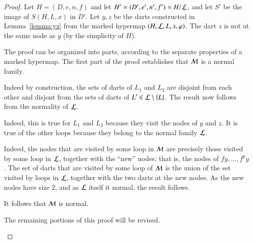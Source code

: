 \begin{proof} Let $H=(D,e,n,f)$ and let $H' =(D',e',n',f') = H/{\cal
    L}$, and let $S'$ be the image of $S(H,L,x)$ in $D'$.  Let $y,z$
  be the darts constructed in Lemma~\ref{lemma:yz} from the marked
  hypermap $(H,{\cal L},L,x,\varphi)$.  The dart
$z$ is not at the same node as $y$ (by the simplicity of $H$).

  The proof can be organized into parts, according to the separate
  properties of a marked hypermap.  The first part of the proof
  establishes that ${\cal M}$ is a normal family.




 
Indeed by construction, the sets of darts of $L_1$ and $L_2$
are disjoint from each other and disjont from the sets of darts of $L'\in
{\cal L}\setminus \{L\}$.  The result now follows from the normality of  ${\cal L}$.

   Indeed, this
is true for $L_1$ and $L_2$ because they visit the nodes of $y$ and
$z$.  It is true of the other loops because they belong to the
normal family ${\cal L}$. 

  
Indeed, the nodes that are visited by some loop in ${\cal M}$ are
precisely those visited by some loop in ${\cal L}$, together with the
``new'' nodes; that is, the nodes of $f y,\ldots,f^p y$.  The set of
darts that are visited by some loop of ${\cal M}$ is the union of the
set visited by loops in ${\cal L}$, together with the two darts at the
new nodes.  As the new nodes have size $2$, and as ${\cal L}$ itself
it normal, the result follows.

It follows that ${\cal M}$ is normal.  

\begin{note} %
The remaining portions of this proof will be revised.
\end{note}



\end{proof}
